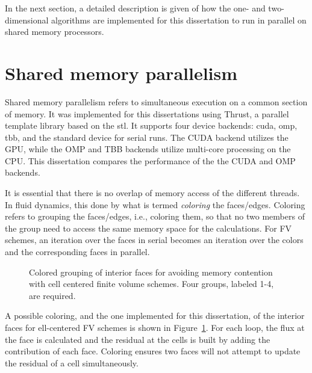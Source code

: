 In the next section, a detailed description is given of how the one- and two-dimensional algorithms are implemented for this dissertation to run in parallel on shared memory processors.

\section[Shared memory parallelism]{Shared memory parallelism}
\label{sec:shared_memory}

Shared memory parallelism refers to simultaneous execution on a common section of memory.  It was implemented for this dissertations using Thrust, a \cpp  parallel template library based on the \gls{stl}.  It supports four device backends: \gls{cuda}, \gls{omp}, \gls{tbb}, and the standard \cpp device for serial runs.  The CUDA backend utilizes the GPU, while the OMP and TBB backends utilize multi-core processing on the CPU.  This dissertation compares the performance of the the CUDA and OMP backends.

It is essential that there is no overlap of memory access of the different threads.  In fluid dynamics, this done by what is termed \emph{coloring} the faces/edges.  Coloring refers to grouping the faces/edges, i.e., coloring them, so that no two members of the group need to access the same memory space for the calculations.  For FV schemes, an iteration over the faces in serial becomes an iteration over the colors and the corresponding faces in parallel. 

\begin{figure}[htbp]\figSpace
\begin{center}

\end{center}
\caption{Colored grouping of interior faces for avoiding memory contention with cell centered finite volume schemes.  Four groups, labeled 1-4, are required.}
\label{fig:face_color_1}
\figSpace
\end{figure}

A possible coloring, and the one implemented for this dissertation, of the interior faces for ell-centered FV schemes is shown in Figure~\ref{fig:face_color_1}.  For each loop, the flux at the face is calculated and the residual at the cells is built by adding the contribution of each face.  Coloring ensures two faces will not attempt to update the residual of a cell simultaneously.

